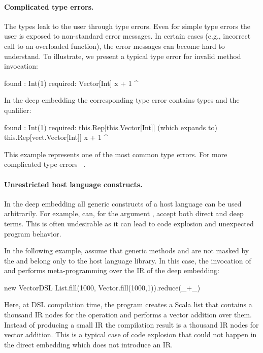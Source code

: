 \paragraph{Complicated type errors.} The  types leak to the user through type errors. Even for simple type errors the user is exposed to non-standard error messages. In certain cases (e.g., incorrect call to an overloaded function), the error messages can become hard to understand. To illustrate, we present a typical type error for invalid method invocation:
\begin{lstparagraph}
  found   : Int(1)
  required: Vector[Int]
       x + 1
           ^
\end{lstparagraph}
In the deep embedding the corresponding type error contains  types and the  qualifier:
\begin{lstparagraph}
  found   : Int(1)
  required: this.Rep[this.Vector[Int]]
       (which expands to) this.Rep[vect.Vector[Int]]
       x + 1
           ^
\end{lstparagraph}
This example represents one of the  most common type errors. For more complicated type errors
~\cite{techrep}. \paragraph{Unrestricted host language constructs.} In the deep embedding all
generic constructs of a host language can be used arbitrarily. For example,
 can, for the argument , accept
both direct and deep terms. This is often undesirable as it can lead
 to code explosion and unexpected program behavior.

In the following example, assume that generic methods  and
 are not masked by the  and belong only to the host
language library. In this case, the invocation of  and 
performs meta-programming over the IR of the deep embedding:\vspace{3pt}

\begin{listingtiny}
  new VectorDSL {
    List.fill(1000, Vector.fill(1000,1)).reduce(_+_)
  }
\end{listingtiny}\vspace{3pt}

Here, at DSL compilation time, the program creates a Scala list that contains a thousand
IR nodes for the  operation and performs a vector addition over them.
Instead of producing a small IR the compilation result is a thousand IR nodes for
vector addition. This is a typical case of code explosion that could not happen
in the direct embedding which does not introduce an IR.

